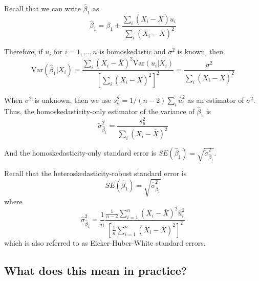 \documentclass[a4paper,11pt]{article}
\newcommand{\var}{\mathrm{Var}}
\begin{document}
Recall that we can write \(\hat{\beta}_1\) as
\begin{equation*}
\hat{\beta}_1 = \beta_1 + \frac{\sum_i (X_i - \bar{X})u_i}{\sum_i
(X_i - \bar{X})^2} 
\end{equation*} 

Therefore, if \(u_i\) for \(i=1, \ldots, n\) is
homoskedastic and \(\sigma^2\) is known, then
\begin{equation}
\label{eq:vbeta-1a} \var(\hat{\beta}_1 | X_i) = \frac{\sum_i (X_i -
\bar{X})^2 \var(u_i|X_i)}{\left[\sum_i (X_i - \bar{X})^2\right]^2} =
\frac{\sigma^2}{\sum_i (X_i - \bar{X})^2} 
\end{equation} 

When \(\sigma^2\) is unknown, then we use \(s^2_u = 1/(n-2) \sum_i
\hat{u}_i^2\) as an estimator of \(\sigma^2\). Thus, the
homoskedasticity-only estimator of the variance of \(\hat{\beta}_1\) is
\begin{equation}
\label{eq:vbeta-1b} \tilde{\sigma}^2_{\hat{\beta}_1} =
\frac{s^2_u}{\sum_i (X_i - \bar{X})^2} 
\end{equation} 

And the homoskedasticity-only standard error is \(SE(\hat{\beta}_1) =
\sqrt{\tilde{\sigma}^2_{\hat{\beta}_1}}\).

Recall that the heteroskedasticity-robust standard error is
\begin{equation*}
SE(\hat{\beta}_1) = \sqrt{\hat{\sigma}^2_{\hat{\beta}_1}}
\end{equation*} 
where
\begin{equation*}
\hat{\sigma}^2_{\hat{\beta}_1} = \frac{1}{n} \frac{\frac{1}{n-2}
\sum_{i=1}^n (X_i - \bar{X})^2 \hat{u}^2_i}{\left[ \frac{1}{n}
\sum_{i=1}^n (X_i - \bar{X})^2 \right]^2} 
\end{equation*} 
which is also referred to as Eicker-Huber-White standard errors.


\subsection{What does this mean in practice?}
\label{sec:org72a5d02}
\end{document}
